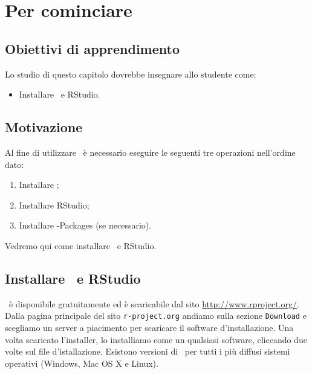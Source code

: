 \chapter{Per cominciare}\label{cha:install}


\section*{Obiettivi di apprendimento}

Lo studio di questo capitolo dovrebbe insegnare allo studente come:
\begin{itemize}
\item 
  Installare \R\, e RStudio.
\end{itemize}


\section*{Motivazione}

Al fine di utilizzare \R\, è necessario eseguire le seguenti tre operazioni nell'ordine dato:
\begin{enumerate}
\item Installare \R;
\item Installare RStudio;
\item Installare \R-Packages (se necessario).
\end{enumerate}
Vedremo qui come installare \R\, e RStudio.


\section{Installare \R\, e RStudio}

\R\, è disponibile gratuitamente ed è scaricabile dal sito \url{http://www.rproject.org/}. 
Dalla pagina principale del sito \verb+r-project.org+ andiamo sulla sezione \verb+Download+ e scegliamo un server a piacimento per scaricare il software d'installazione. 
Una volta scaricato l'installer, lo installiamo come un qualsiasi software, cliccando due volte sul file d'istallazione. 
Esistono versioni di \R\, per tutti i più diffusi sistemi operativi (Windows, Mac OS X e Linux).

